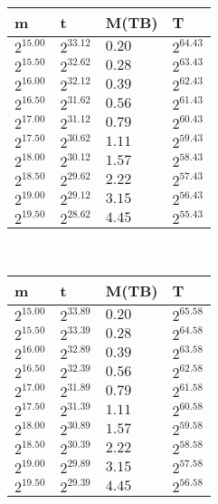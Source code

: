 \begin{tabular}{llll}
m & t & M(TB) & T \\ \hline
$2^{15.00}$ & $2^{33.12}$ & $0.20$ & $2^{64.43}$ \\
$2^{15.50}$ & $2^{32.62}$ & $0.28$ & $2^{63.43}$ \\
$2^{16.00}$ & $2^{32.12}$ & $0.39$ & $2^{62.43}$ \\
$2^{16.50}$ & $2^{31.62}$ & $0.56$ & $2^{61.43}$ \\
$2^{17.00}$ & $2^{31.12}$ & $0.79$ & $2^{60.43}$ \\
$2^{17.50}$ & $2^{30.62}$ & $1.11$ & $2^{59.43}$ \\
$2^{18.00}$ & $2^{30.12}$ & $1.57$ & $2^{58.43}$ \\
$2^{18.50}$ & $2^{29.62}$ & $2.22$ & $2^{57.43}$ \\
$2^{19.00}$ & $2^{29.12}$ & $3.15$ & $2^{56.43}$ \\
$2^{19.50}$ & $2^{28.62}$ & $4.45$ & $2^{55.43}$ \\
\end{tabular}
 \ 
\begin{tabular}{llll}
m & t & M(TB) & T \\ \hline
$2^{15.00}$ & $2^{33.89}$ & $0.20$ & $2^{65.58}$ \\
$2^{15.50}$ & $2^{33.39}$ & $0.28$ & $2^{64.58}$ \\
$2^{16.00}$ & $2^{32.89}$ & $0.39$ & $2^{63.58}$ \\
$2^{16.50}$ & $2^{32.39}$ & $0.56$ & $2^{62.58}$ \\
$2^{17.00}$ & $2^{31.89}$ & $0.79$ & $2^{61.58}$ \\
$2^{17.50}$ & $2^{31.39}$ & $1.11$ & $2^{60.58}$ \\
$2^{18.00}$ & $2^{30.89}$ & $1.57$ & $2^{59.58}$ \\
$2^{18.50}$ & $2^{30.39}$ & $2.22$ & $2^{58.58}$ \\
$2^{19.00}$ & $2^{29.89}$ & $3.15$ & $2^{57.58}$ \\
$2^{19.50}$ & $2^{29.39}$ & $4.45$ & $2^{56.58}$ \\
\end{tabular}
 \ 
